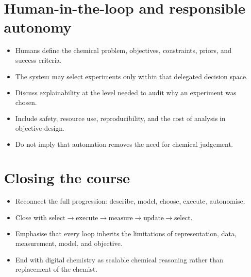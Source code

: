 
\section{Human-in-the-loop and responsible autonomy}

\begin{itemize}
  \item Humans define the chemical problem, objectives, constraints, priors, and success criteria.
  \item The system may select experiments only within that delegated decision space.
  \item Discuss explainability at the level needed to audit why an experiment was chosen.
  \item Include safety, resource use, reproducibility, and the cost of analysis in objective design.
  \item Do not imply that automation removes the need for chemical judgement.
\end{itemize}

\section{Closing the course}

\begin{itemize}
  \item Reconnect the full progression: describe, model, choose, execute, autonomise.
  \item Close with $\text{select}\rightarrow\text{execute}\rightarrow\text{measure}\rightarrow\text{update}\rightarrow\text{select}$.
  \item Emphasise that every loop inherits the limitations of representation, data, measurement, model, and objective.
  \item End with digital chemistry as scalable chemical reasoning rather than replacement of the chemist.
\end{itemize}

